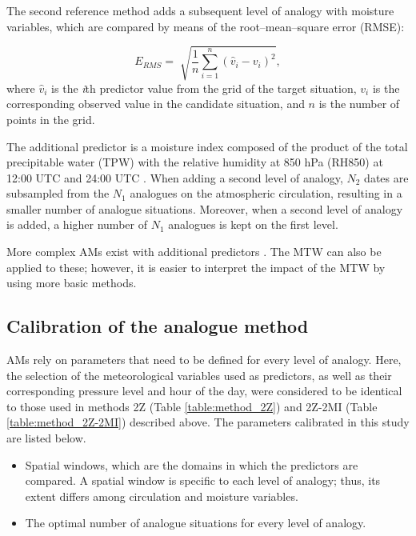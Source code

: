\documentclass[hess, manuscript]{copernicus}
\begin{document}
	The second reference method \citep[2Z-2MI, Table \ref{table:method_2Z-2MI};][]{Bontron2005} adds a subsequent level of analogy with moisture variables, which are compared by means of the root--mean--square error (RMSE):
	
	\begin{equation}
	\label{eq:RMSE}
	E_{RMS}= \sqrt[]{ \frac{1}{n} \sum_{i=1}^{n}(\hat{v}_{i} - v_{i})^{2}} ,
	\end{equation}
	where $\hat{v}_{i}$ is the \textit{i}th predictor value from the grid of the target situation, $v_{i}$ is the corresponding observed value in the candidate situation, and $n$ is the number of points in the grid.
	
	The additional predictor is a moisture index composed of the product of the total precipitable water (TPW) with the relative humidity at 850 hPa (RH850) at 12:00 UTC and 24:00 UTC \citep{Bontron2004}. When adding a second level of analogy, $N_{2}$ dates are subsampled from the $N_{1}$ analogues on the atmospheric circulation, resulting in a smaller number of analogue situations. Moreover, when a second level of analogy is added, a higher number of $N_{1}$ analogues is kept on the first level.
	
	More complex AMs exist with additional predictors \citep[e.g.][]{Horton2012a, BenDaoud2016, Caillouet2016}. The MTW can also be applied to these; however, it is easier to interpret the impact of the MTW by using more basic methods.
	
	
	\subsection{Calibration of the analogue method}
	\label{sec:calibration}
	
	AMs rely on parameters that need to be defined for every level of analogy. Here, the selection of the meteorological variables used as predictors, as well as their corresponding pressure level and hour of the day, were considered to be identical to those used in methods 2Z (Table \ref{table:method_2Z}) and 2Z-2MI (Table \ref{table:method_2Z-2MI}) described above. The parameters calibrated in this study are listed below.
	
	\begin{itemize}
		\item Spatial windows, which are the domains in which the predictors are compared. A spatial window is specific to each level of analogy; thus, its extent differs among circulation and moisture variables.
		\item The optimal number of analogue situations for every level of analogy.
	\end{itemize}
	
\end{document}
